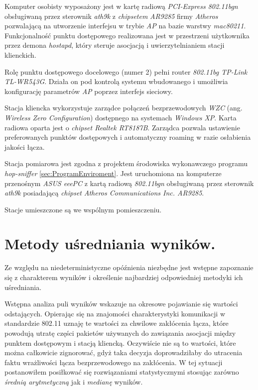 Komputer osobisty wyposażony jest w kartę radiową \emph{PCI-Express 802.11bgn} obsługiwaną przez sterownik \emph{ath9k} z \emph{chipsetem} \emph{AR9285} firmy \emph{Atheros} pozwalającą na utworzenie interfejsu w trybie \emph{AP} na bazie warstwy \emph{mac80211}. Funkcjonalność punktu dostępowego realizowana jest w przestrzeni użytkownika przez demona \emph{hostapd}, który steruje asocjacją i uwierzytelnianiem stacji klienckich. 

Rolę punktu dostępowego docelowego (numer 2) pełni router \emph{802.11bg TP-Link TL-WR543G}. Działa on pod kontrolą systemu wbudowanego i umożliwia konfigurację parametrów \emph{AP} poprzez interfejs sieciowy. 

Stacja kliencka wykorzystuje zarządce połączeń bezprzewodowych \emph{WZC} (ang. \emph{Wireless Zero Configuration}) dostępnego na systemach \emph{Windows XP}. Karta radiowa oparta jest o \emph{chipset Realtek RT8187B}. Zarządca pozwala ustawienie preferowanych punktów dostępowych i automatyczny roaming w razie osłabienia jakości łącza. 

Stacja pomiarowa jest zgodna z projektem środowiska wykonawczego programu \emph{hop-sniffer} \ref{sec:ProgramEnviroment}. Jest uruchomiona na komputerze przenośnym \emph{ASUS eeePC} z kartą radiową \emph{802.11bgn} obsługiwaną przez sterownik \emph{ath9k} posiadającą \emph{chipset} \emph{Atheros Communications Inc. AR9285}.

Stacje umieszczone są we wspólnym pomieszczeniu.

\section{Metody uśredniania wyników.}

Ze względu na niedeterministyczne opóźnienia niezbędne jest wstępne zapoznanie się z charakterem wyników i określenie najbardziej odpowiedniej metodyki ich uśredniania. 

Wstępna analiza puli wyników wskazuje na okresowe pojawianie się wartości odstających. Opierając się na znajomości charakterystyki komunikacji w standardzie 802.11 uznaję te wartości za chwilowe zakłócenia łącza, które powodują utratę części pakietów używanych do zawiązania asocjacji między punktem dostępowym i stacją kliencką. Oczywiście nie są to wartości, które można całkowicie zignorować, gdyż taka decyzja doprowadziłaby do utracenia faktu wrażliwości łącza bezprzewodowego na zakłócenia. W tej sytuacji postanowiłem posiłkować się rozwiązaniami statystycznymi stosując zarówno \emph{średnią arytmetyczną} jak i \emph{medianę} wyników. 

